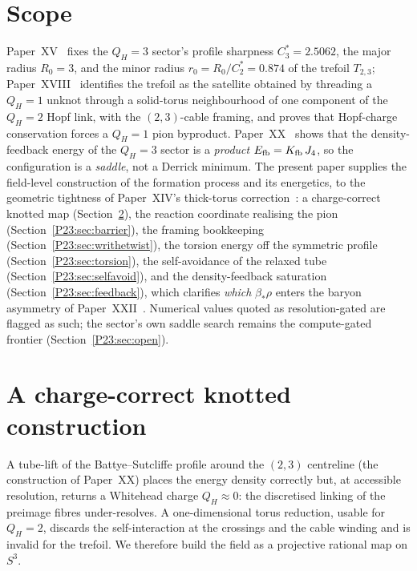 \documentclass[11pt,a4paper]{article}
\theoremstyle{definition}\newtheorem{definition}[theorem]{Definition}
\newcommand{\QH}{Q_H}
\begin{document}
\tableofcontents

\section{Scope}
\label{P23:sec:scope}
Paper~XV~\cite{Paper15} fixes the $\QH=3$ sector's profile sharpness $C_3^\ast=2.5062$, the
major radius $R_0=3$, and the minor radius $r_0=R_0/C_2^\ast=0.874$ of the trefoil
$T_{2,3}$; Paper~XVIII~\cite{Paper18} identifies the trefoil as the satellite obtained by
threading a $\QH=1$ unknot through a solid-torus neighbourhood of one component of the $\QH=2$
Hopf link, with the $(2,3)$-cable framing, and proves that Hopf-charge conservation forces a
$\QH=1$ pion byproduct. Paper~XX~\cite{Paper20} shows that the density-feedback energy of the
$\QH=3$ sector is a \emph{product} $E_{\rm fb}=K_{\rm fb}\,J_4$, so the configuration is a
\emph{saddle}, not a Derrick minimum. The present paper supplies the field-level construction
of the formation process and its energetics, to the geometric tightness of Paper~XIV's
thick-torus correction~\cite{Paper14}: a charge-correct knotted map
(Section~\ref{P23:sec:construction}), the reaction coordinate realising the pion
(Section~\ref{P23:sec:barrier}), the framing bookkeeping
(Section~\ref{P23:sec:writhetwist}), the torsion energy off the symmetric profile
(Section~\ref{P23:sec:torsion}), the self-avoidance of the relaxed tube
(Section~\ref{P23:sec:selfavoid}), and the density-feedback saturation
(Section~\ref{P23:sec:feedback}), which clarifies \emph{which} $\beta_*\rho$ enters the baryon
asymmetry of Paper~XXII~\cite{Paper22}. Numerical values quoted as resolution-gated are flagged
as such; the sector's own saddle search remains the compute-gated frontier
(Section~\ref{P23:sec:open}).

\section{A charge-correct knotted construction}
\label{P23:sec:construction}
A tube-lift of the Battye--Sutcliffe profile around the $(2,3)$ centreline (the construction of
Paper~XX) places the energy density correctly but, at accessible resolution, returns a Whitehead
charge $Q_H\approx0$: the discretised linking of the preimage fibres under-resolves. A
one-dimensional torus reduction, usable for $\QH=2$, discards the self-interaction at the
crossings and the cable winding and is invalid for the trefoil. We therefore build the field as
a projective rational map on $S^3$.
\end{document}
